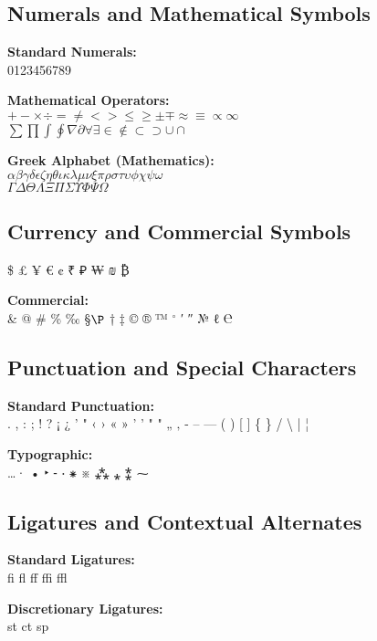 \documentclass[11pt,letterpaper]{article}
\begin{document}
\subsection{Numerals and Mathematical Symbols}

\textbf{Standard Numerals:}\\
{\LARGE 0123456789}

\textbf{Mathematical Operators:}\\
{\Large $+ - \times \div = \neq < > \leq \geq \pm \mp \approx \equiv \propto \infty$}\\
{\Large $\sum \prod \int \oint \nabla \partial \forall \exists \in \notin \subset \supset \cup \cap$}

\textbf{Greek Alphabet (Mathematics):}\\
{\Large $\alpha \beta \gamma \delta \epsilon \zeta \eta \theta \iota \kappa \lambda \mu \nu \xi \pi \rho \sigma \tau \upsilon \phi \chi \psi \omega$}\\
{\Large $\Gamma \Delta \Theta \Lambda \Xi \Pi \Sigma \Upsilon \Phi \Psi \Omega$}

\subsection{Currency and Commercial Symbols}

{\LARGE \$ £ ¥ € ¢ ₹ ₽ ₩ ₪ ₿}

\textbf{Commercial:}\\
{\Large \& @ \# \% ‰ \S $\P$ † ‡ © ® ™ $^\circ$ ′ ″ № ℓ ℮}

\subsection{Punctuation and Special Characters}

\textbf{Standard Punctuation:}\\
{\Large . , : ; ! ? ¡ ¿ ' " ‹ › « » ' ' " " „ ‚ - -- --- ( ) [ ] \{ \} / \textbackslash{} | ¦}

\textbf{Typographic:}\\
{\Large \ldots · • ‣ ⁃ ‧ ⁕ ※ ⁂ ⁎ ⁑ ⁓}

\subsection{Ligatures and Contextual Alternates}

\textbf{Standard Ligatures:}\\
{\Large fi fl ff ffi ffl}

\textbf{Discretionary Ligatures:}\\
{\Large st ct sp}
\end{document}
